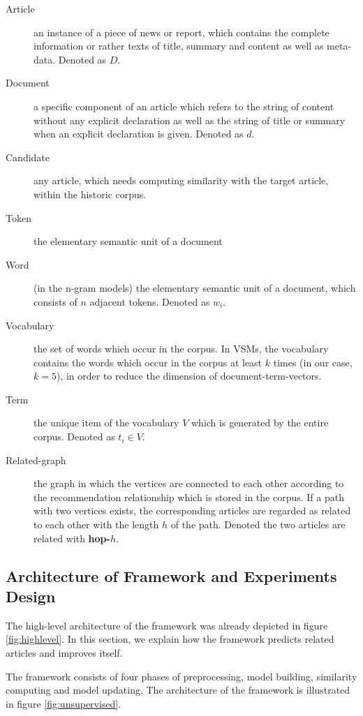 \begin{description}
\item[Article] an instance of a piece of news or report, which contains the complete information or rather texts of title, summary and content as well as meta-data. Denoted as $D$.
\item[Document] a specific component of an article which refers to the string of content without any explicit declaration as well as the string of title or summary when an explicit declaration is given. Denoted as $d$.
\item[Candidate] any article, which needs computing similarity with the target article, within the historic corpus.
\item[Token] the elementary semantic unit of a document 
\item[Word] (in the n-gram models) the elementary semantic unit of a document, which consists of $n$ adjacent tokens. Denoted as $w_i$. 
\item[Vocabulary] the set of words which occur in the corpus. In VSMs, the vocabulary contains the words which occur in the corpus at least $k$ times (in our case, $k=5$), in order to reduce the dimension of document-term-vectors. 
\item[Term] the unique item of the vocabulary $V$ which is generated by the entire corpus. Denoted as $t_i \in V$. 
\item[Related-graph] the graph in which the vertices are connected to each other according to the recommendation relationship which is stored in the corpus. If a path with two vertices exists, the corresponding articles are regarded as related to each other with the length $h$ of the path. Denoted the two articles are related with \textbf{hop-$h$}.

\label{tab:def_terms}
\end{description}


\subsection{Architecture of Framework and Experiments Design}
\label{sec:4.3}

The high-level architecture of the framework was already depicted in figure \ref{fig:highlevel}. In this section, we explain how the framework predicts related articles and improves itself. 

The framework consists of four phases of preprocessing, model building, similarity computing and model updating. The architecture of the framework is illustrated in figure \ref{fig:unsupervised}. 


